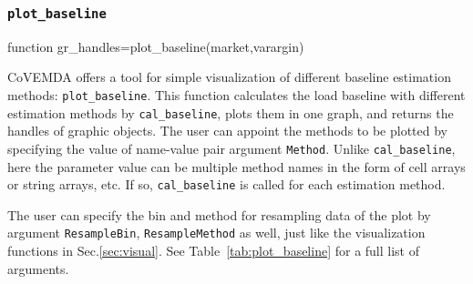 \documentclass[10pt]{article}
\newcommand{\covemda}{CoVEMDA}
\numberwithin{equation}{section}
\numberwithin{table}{section}
\numberwithin{figure}{section}
\begin{document}
\subsubsection{\texttt{plot\_baseline}}\label{func:plot_baseline}

\begin{Code}
function gr_handles=plot_baseline(market,varargin)
\end{Code}

\covemda{} offers a tool for simple visualization of different baseline estimation methods: \verb!plot_baseline!. This function calculates the load baseline with different estimation methods by \verb!cal_baseline!, plots them in one graph, and returns the handles of graphic objects. The user can appoint the methods to be plotted by specifying the value of name-value pair argument \verb!Method!. Unlike \verb!cal_baseline!, here the parameter value can be multiple method names in the form of cell arrays or string arrays, etc. If so, \verb!cal_baseline! is called for each estimation method.

The user can specify the bin and method for resampling data of the plot by argument \verb!ResampleBin!, \verb!ResampleMethod! as well, just like the visualization functions in Sec.\ref{sec:visual}. See Table~\ref{tab:plot_baseline} for a full list of arguments.
\end{document}
